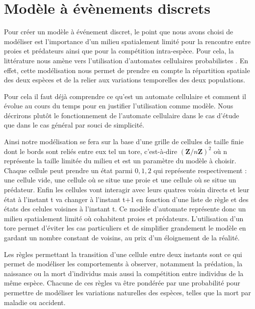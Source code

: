 \chapter{Modèle à évènements discrets}
\label{chapitre:etat_discret}

Pour créer un modèle à événement discret, le point que nous avons choisi de modéliser est l'importance d'un milieu spatialement limité pour la rencontre entre proies et prédateurs ainsi que pour la compétition intra-espèce. Pour cela, la littérature nous amène vers l'utilisation d'automates cellulaires probabilistes \cite{Carvalho} . En effet, cette modélisation nous permet de prendre en compte la répartition spatiale des deux espèces et de la relier aux variations temporelles des deux populations. 


Pour cela il faut déjà comprendre ce qu'est un automate cellulaire et comment il évolue au cours du temps pour en justifier l'utilisation comme modèle. Nous décrirons plutôt le fonctionnement de l'automate cellulaire dans le cas d'étude que dans le cas général par souci de simplicité.

\vspace{0.3cm}
Ainsi notre modélisation se fera sur la base d'une grille de cellules de taille finie dont le bords sont reliés entre eux tel un tore, c'est-à-dire ${(\mathbf{Z}/n\mathbf{Z})^2}$ où n représente la taille limitée du milieu et est un paramètre du modèle à choisir. Chaque cellule peut prendre un état parmi ${0,1,2}$ qui représente respectivement : une cellule vide, une cellule où se situe une proie et une cellule où se situe un prédateur. Enfin les cellules vont interagir avec leurs quatres voisin directs et leur état à l'instant t va changer à l'instant t+1 en fonction d'une liste de règle et des états des celules voisines à l'instant t. Ce modèle d'automate représente donc un milieu spatialement limité où cohabitent proies et prédateurs. L'utilisation d'un tore permet d'éviter les cas particuliers et de simplifier grandement le modèle en gardant un nombre constant de voisins, au prix d'un éloignement de la réalité.

\vspace{0.3cm}
Les règles permettant la transition d'une cellule entre deux instants sont ce qui permet de modéliser les comportements à observer, notamment la prédation, la naissance ou la mort d'individus mais aussi la compétition entre individus de la même espèce. Chacune de ces règles va être pondérée par une probabilité pour permettre de modéliser les variations naturelles des espèces, telles que la mort par maladie ou accident.


